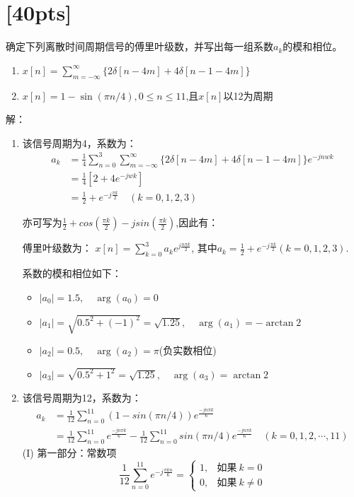 \documentclass[a4paper,UTF8]{article}
\numberwithin{equation}{section}
\begin{document}
\newpage
\section{[40pts]}
确定下列离散时间周期信号的傅里叶级数，并写出每一组系数$a_{k}$的模和相位。
\begin{enumerate}[(1)]
    \item $x[n]=\sum\limits_{m=-\infty}^{\infty}\{2\delta{[n-4m]}+4\delta{[n-1-4m]}\}$
    \item $x[n]=1-\sin{(\pi n/4)},0\le n\le 11$,且$x[n]$以12为周期
\end{enumerate}

\begin{framed}
	解：
    \begin{enumerate}[(1)]
       \item 该信号周期为4，系数为：
       \begin{align*}
       	a_k &= \frac{1}{4}\sum\limits_{n = 0}^{3}\sum\limits_{m=-\infty}^{\infty}\{2\delta{[n-4m]}+4\delta{[n-1-4m]}\}e^{-jnwk}\\
       	&= \frac{1}{4}[2+4e^{-jwk}]\\
       	&= \frac{1}{2} + e^{-j\frac{\pi k}{2}}\quad(k = 0,1,2,3)
       \end{align*}
      
       亦可写为$\frac{1}{2} + cos(\frac{\pi k}{2})-jsin(\frac{\pi k}{2})$,因此有：
       
       傅里叶级数为：
       $x[n] = \sum\limits_{k=0}^{3}a_ke^{j\frac{n\pi k}{2}}$, 其中$a_k = \frac{1}{2} + e^{-j\frac{\pi k}{2}}(k = 0,1,2,3)$.
       
       系数的模和相位如下：
       \begin{itemize}
       	\item \( |a_0| = 1.5, \quad \arg(a_0) = 0 \)
       	\item \( |a_1| = \sqrt{0.5^2 + (-1)^2} = \sqrt{1.25} , \quad \arg(a_1) = -\arctan2 \)
       	\item \( |a_2| = 0.5, \quad \arg(a_2) = \pi \)(负实数相位)
       	\item \( |a_3| = \sqrt{0.5^2 + 1^2} = \sqrt{1.25}, \quad \arg(a_3) = \arctan2 \)
       \end{itemize}
       
       \item  该信号周期为12，系数为：
       \begin{align*}
       	a_k &= \frac{1}{12}\sum\limits_{n = 0}^{11}(1-sin(\pi n/4))e^{\frac{-jn\pi k}{6}}\\
       	& = \frac{1}{12}\sum\limits_{n = 0}^{11}e^{\frac{-jn\pi k}{6}} - \frac{1}{12}\sum\limits_{n = 0}^{11}sin(\pi n/4)e^{\frac{-jn\pi k}{6}}\quad(k = 0,1,2,\cdots,11)
       \end{align*}
      	 (I) 第一部分：常数项
      	\[
      	\frac{1}{12} \sum_{n=0}^{11} e^{-j \frac{\pi k n}{6}} = 
      	\begin{cases}
      		1, & \text{如果} \ k = 0 \\
      		0, & \text{如果} \ k \neq 0
      	\end{cases}
      	\]
      	

\end{enumerate}
\end{framed}
\end{document}
